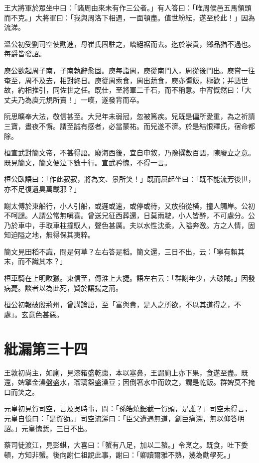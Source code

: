 王大將軍於眾坐中曰：「諸周由來未有作三公者。」有人答曰：「唯周侯邑五馬領頭而不克。」大將軍曰：「我與周洛下相遇，一面頓盡。值世紛紜，遂至於此！」因為流涕。

溫公初受劉司空使勸進，母崔氏固駐之，嶠絕裾而去。迄於崇貴，鄉品猶不過也。每爵皆發詔。

庾公欲起周子南，子南執辭愈固。庾每詣周，庾從南門入，周從後門出。庾嘗一往奄至，周不及去，相對終日。庾從周索食，周出蔬食，庾亦彊飯，極歡；并語世故，約相推引，同佐世之任。既仕，至將軍二千石，而不稱意。中宵慨然曰：「大丈夫乃為庾元規所賣！」一嘆，遂發背而卒。

阮思曠奉大法，敬信甚至。大兒年未弱冠，忽被篤疾。兒既是偏所愛重，為之祈請三寶，晝夜不懈。謂至誠有感者，必當蒙祐。而兒遂不濟。於是結恨釋氏，宿命都除。

桓宣武對簡文帝，不甚得語。廢海西後，宜自申敘，乃豫撰數百語，陳廢立之意。既見簡文，簡文便泣下數十行。宣武矜愧，不得一言。

桓公臥語曰：「作此寂寂，將為文、景所笑！」既而屈起坐曰：「既不能流芳後世，亦不足復遺臭萬載邪？」

謝太傅於東船行，小人引船，或遲或速，或停或待，又放船從橫，撞人觸岸。公初不呵譴。人謂公常無嗔喜。曾送兄征西葬還，日莫雨駛，小人皆醉，不可處分。公乃於車中，手取車柱撞馭人，聲色甚厲。夫以水性沈柔，入隘奔激。方之人情，固知迫隘之地，無得保其夷粹。

簡文見田稻不識，問是何草？左右答是稻。簡文還，三日不出，云：「寧有賴其末，而不識其本？」

桓車騎在上明畋獵。東信至，傳淮上大捷。語左右云：「群謝年少，大破賊。」因發病薨。談者以為此死，賢於讓揚之荊。

桓公初報破殷荊州，曾講論語，至「富與貴，是人之所欲，不以其道得之，不處」。玄意色甚惡。



\chapter{紕漏第三十四}

王敦初尚主，如廁，見漆箱盛乾棗，本以塞鼻，王謂廁上亦下果，食遂至盡。既還，婢擎金澡盤盛水，瑠璃盌盛澡豆；因倒箸水中而飲之，謂是乾飯。群婢莫不掩口而笑之。

元皇初見賀司空，言及吳時事，問：「孫皓燒鋸截一賀頭，是誰？」司空未得言，元皇自憶曰：「是賀劭。」司空流涕曰：「臣父遭遇無道，創巨痛深，無以仰答明詔。」元皇愧慙，三日不出。

蔡司徒渡江，見彭蜞，大喜曰：「蟹有八足，加以二螯。」令烹之。既食，吐下委頓，方知非蟹。後向謝仁祖說此事，謝曰：「卿讀爾雅不熟，幾為勸學死。」

